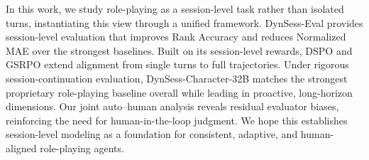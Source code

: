 

In this work, we study role-playing as a session-level task rather than isolated turns, instantiating this view through a unified framework. DynSess-Eval provides session-level evaluation that improves Rank Accuracy and reduces Normalized MAE over the strongest baselines. Built on its session-level rewards, DSPO and GSRPO extend alignment from single turns to full trajectories. Under rigorous session-continuation evaluation, DynSess-Character-32B matches the strongest proprietary role-playing baseline overall while leading in proactive, long-horizon dimensions. Our joint auto–human analysis reveals residual evaluator biases, reinforcing the need for human-in-the-loop judgment. We hope this establishes session-level modeling as a foundation for consistent, adaptive, and human-aligned role-playing agents.
















